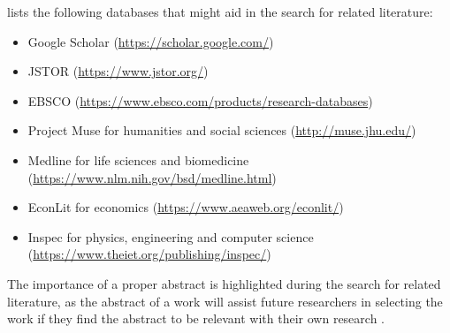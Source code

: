 \documentclass{strrespaper-trad}
\begin{document}
			\textcite{mccombesLiteratureReviewComplete2019} lists the following databases that might aid in the search for related literature:
			\begin{itemize}
				\item Google Scholar (\url{https://scholar.google.com/})
				\item JSTOR (\url{https://www.jstor.org/})
				\item EBSCO (\url{https://www.ebsco.com/products/research-databases})
				\item Project Muse for humanities and social sciences (\url{http://muse.jhu.edu/})
				\item Medline for life sciences and biomedicine (\url{https://www.nlm.nih.gov/bsd/medline.html})
				\item EconLit for economics (\url{https://www.aeaweb.org/econlit/})
				\item Inspec for physics, engineering and computer science (\url{https://www.theiet.org/publishing/inspec/})
			\end{itemize}
			The importance of a proper abstract is highlighted during the search for related literature, as the abstract of a work will assist future researchers in selecting the work if they find the abstract to be relevant with their own research \autocite{mccombesLiteratureReviewComplete2019}.
\end{document}
